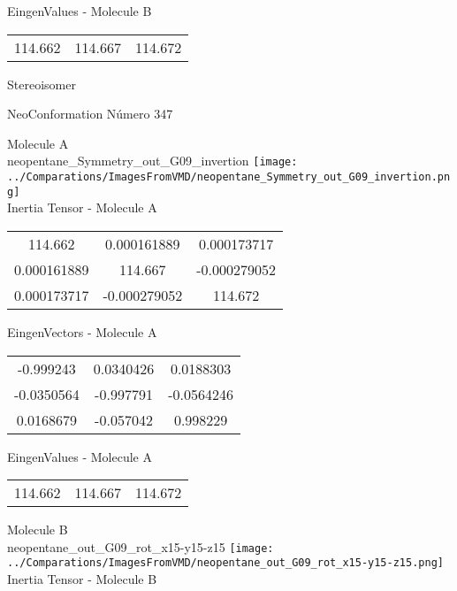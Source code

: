 \begin{multicols}{2}
\begin{center}
\vtab
 EingenValues - Molecule B     \\
\vtab
\begin{tabular}{|c c c|}
114.662	 & 	114.667	 & 	114.672	 \\
\end{tabular}

\end{center}
\end{multicols}
\begin{center}
\vtab
\vtab
\textcolor{NavyBlue}{\Large Stereoisomer}
\end{center}

 \newpage

\vtab[-2cm]
\begin{center}
{\large NeoConformation \tab Número 347}
\end{center}
\begin{multicols}{2}
\begin{center}

Molecule A \\ 
neopentane\_Symmetry\_out\_G09\_invertion
\texttt{[image: ../Comparations/ImagesFromVMD/neopentane\_Symmetry\_out\_G09\_invertion.png]}
\\
Inertia Tensor - Molecule A \\
\vtab

\begin{tabular}{|c c c|}
114.662	 & 	0.000161889	 & 	0.000173717	 \\
0.000161889	 & 	114.667	 & 	-0.000279052	 \\
0.000173717	 & 	-0.000279052	 & 	114.672
\end{tabular}

\vtab
 EingenVectors - Molecule A     \\
\vtab
\begin{tabular}{|c c c|}
-0.999243	 & 	0.0340426	 & 	0.0188303	 \\
-0.0350564	 & 	-0.997791	 & 	-0.0564246	 \\
0.0168679	 & 	-0.057042	 & 	0.998229
\end{tabular}

\vtab
 EingenValues - Molecule A     \\
\vtab
\begin{tabular}{|c c c|}
114.662	 & 	114.667	 & 	114.672	 \\
\end{tabular}
\columnbreak

Molecule B \\ 
neopentane\_out\_G09\_rot\_x15-y15-z15
\texttt{[image: ../Comparations/ImagesFromVMD/neopentane\_out\_G09\_rot\_x15-y15-z15.png]}
\\
Inertia Tensor - Molecule B \\
\vtab


\end{center}
\end{multicols}
